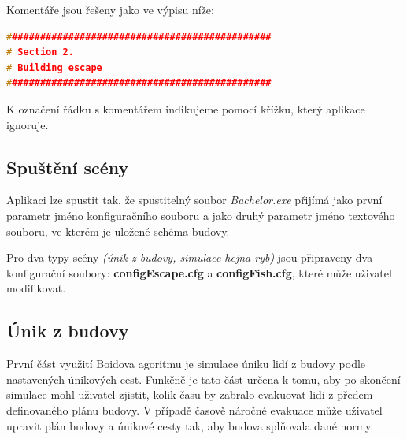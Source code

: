 \documentclass[czech,public,dept460,male,cpdeclaration]{diploma}
\begin{document}
Komentáře jsou řešeny jako ve výpisu níže:


\begin{lstlisting}[language=c++,label=src:seek,caption=Ukázka komentáře v konfiguračním souboru]
###############################################
# Section 2. 
# Building escape
###############################################
\end{lstlisting}

K označení řádku s komentářem indikujeme pomocí křížku, který  aplikace ignoruje. 

\subsection{Spuštění scény}\label{sec:spusteni-sceny}
Aplikaci lze spustit tak, že spustitelný soubor \textit{Bachelor.exe} přijímá jako první parametr jméno konfiguračního souboru a jako druhý parametr jméno textového souboru, ve kterém je uložené schéma budovy.

Pro dva typy scény \textit{(únik z budovy, simulace hejna ryb)} jsou připraveny dva konfigurační soubory: \textbf{configEscape.cfg} a \textbf{configFish.cfg}, které může uživatel modifikovat. 


\subsection{Únik z budovy}\label{sec:unik-z-budovy}
První část využití Boidova agoritmu je simulace úniku lidí z budovy podle nastavených únikových cest. Funkčně je tato část určena k tomu, aby po skončení simulace mohl uživatel zjistit, kolik času by zabralo evakuovat lidi z předem definovaného plánu budovy. V případě časově náročné evakuace může uživatel upravit plán budovy a únikové cesty tak, aby budova splňovala dané normy.
\end{document}
